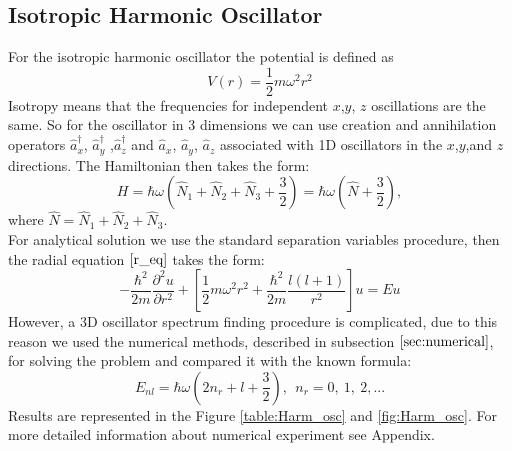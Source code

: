\documentclass[a4paper, 11pt]{article}
\begin{document}
\subsection{Isotropic Harmonic Oscillator}
For the isotropic harmonic oscillator the potential is defined as
$$V(r) = \frac{1}{2} m \omega^2 r^2 $$
Isotropy means that the frequencies for independent $x$,$y$, $z$ oscillations are the same. So for the oscillator in 3 dimensions we can use creation and annihilation operators $\hat{a}_x^\dag$, $\hat{a}_y^\dag$ ,$\hat{a}_z^\dag$ and $\hat{a}_x$,  $\hat{a}_y$, $\hat{a}_z$ associated with 1D oscillators in the $x$,$y$,and $z$ directions. The Hamiltonian then takes the form:
$$H = \hbar \omega (\hat{N}_1 + \hat{N}_2 + \hat{N}_3 + \frac{3}{2}) = \hbar \omega (\hat{N} + \frac{3}{2}),$$
where $\hat{N} = \hat{N}_1 + \hat{N}_2 + \hat{N}_3 .$\\
For analytical solution we use the standard separation variables procedure, then the radial equation  $\eqref{r_eq}$ takes the form:
$$-\frac{\hbar^2}{2m}\frac{\partial^2 u}{\partial r^2}+[\frac{1}{2} m \omega^2 r^2+\frac{\hbar^2}{2m}\frac{l(l+1)}{r^2}]u = Eu$$
However, a  3D oscillator spectrum finding procedure is complicated, due to this reason we used the numerical methods, described in subsection  $\ref{sec:numerical}$, for solving the problem and compared it with the known formula:
\begin{equation}
	E_{nl} = \hbar \omega (2 n_r +l+\frac{3}{2}),~~ n_r = 0,~1,~2,...
\end{equation}
Results are represented in the Figure \ref{table:Harm_osc} and  \ref{fig:Harm_osc}. For more detailed information about numerical experiment see Appendix.
\end{document}
